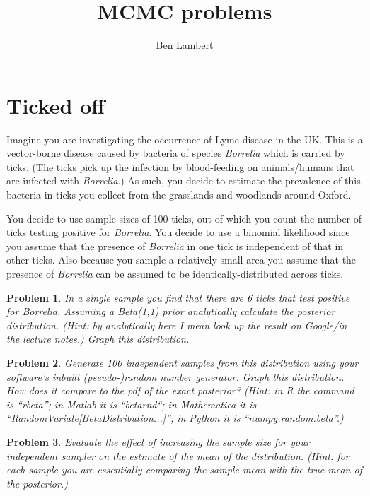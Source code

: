 \documentclass{article}
\title{MCMC problems}
\date{}
\author{Ben Lambert}
\newtheorem{problem}{Problem}[section]
\begin{document}
\maketitle

\section{Ticked off}
Imagine you are investigating the occurrence of Lyme disease in the UK. This is a vector-borne disease caused by bacteria of species \textit{Borrelia} which is carried by ticks. (The ticks pick up the infection by blood-feeding on animals/humans that are infected with \textit{Borrelia}.) As such, you decide to estimate the prevalence of this bacteria in ticks you collect from the grasslands and woodlands around Oxford.

You decide to use sample sizes of 100 ticks, out of which you count the number of ticks testing positive for \textit{Borrelia}. You decide to use a binomial likelihood since you assume that the presence of \textit{Borrelia} in one tick is independent of that in other ticks. Also because you sample a relatively small area you assume that the presence of \textit{Borrelia} can be assumed to be identically-distributed across ticks. 

\begin{problem}
In a single sample you find that there are 6 ticks that test positive for \textit{Borrelia}. Assuming a Beta(1,1) prior analytically calculate the posterior distribution. (Hint: by analytically here I mean look up the result on Google/in the lecture notes.) Graph this distribution. 
\end{problem}

\begin{problem}
Generate 100 independent samples from this distribution using your software's inbuilt (pseudo-)random number generator. Graph this distribution. How does it compare to the pdf of the exact posterior? (Hint: in R the command is ``rbeta''; in Matlab it is ``betarnd``; in Mathematica it is ``RandomVariate[BetaDistribution...]''; in Python it is ``numpy.random.beta''.)
\end{problem}

\begin{problem}
Evaluate the effect of increasing the sample size for your independent sampler on the estimate of the mean of the distribution. (Hint: for each sample you are essentially comparing the sample mean with the true mean of the posterior.)
\end{problem}
\end{document}
